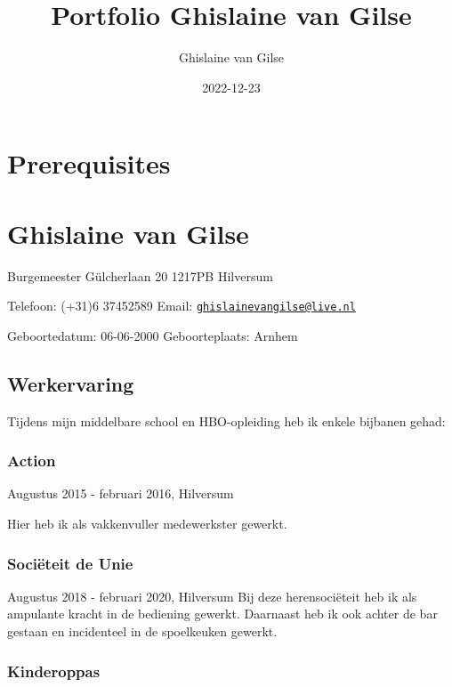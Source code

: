 \documentclass[
]{book}
\title{Portfolio Ghislaine van Gilse}
\author{Ghislaine van Gilse}
\date{2022-12-23}
\begin{document}
\maketitle

{
\setcounter{tocdepth}{1}
\tableofcontents
}
\hypertarget{prerequisites}{%
\chapter{Prerequisites}\label{prerequisites}}

\hypertarget{ghislaine-van-gilse}{%
\chapter{Ghislaine van Gilse}\label{ghislaine-van-gilse}}

Burgemeester Gülcherlaan 20
1217PB Hilversum

Telefoon: (+31)6 37452589
Email: \href{mailto:ghislainevangilse@live.nl}{\nolinkurl{ghislainevangilse@live.nl}}

Geboortedatum: 06-06-2000
Geboorteplaats: Arnhem

\hypertarget{werkervaring}{%
\section{Werkervaring}\label{werkervaring}}

Tijdens mijn middelbare school en HBO-opleiding heb ik enkele bijbanen gehad:

\hypertarget{action}{%
\subsection{Action}\label{action}}

Augustus 2015 - februari 2016, Hilversum

Hier heb ik als vakkenvuller medewerkster gewerkt.

\hypertarget{sociuxebteit-de-unie}{%
\subsection{Sociëteit de Unie}\label{sociuxebteit-de-unie}}

Augustus 2018 - februari 2020, Hilversum
Bij deze herensociëteit heb ik als ampulante kracht in de bediening gewerkt. Daarnaast heb ik ook achter de bar gestaan en incidenteel in de spoelkeuken gewerkt.

\hypertarget{kinderoppas}{%
\subsection{Kinderoppas}\label{kinderoppas}}
\end{document}

